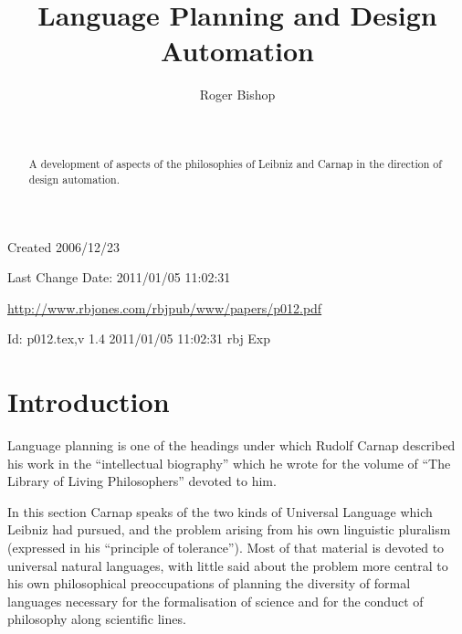 \documentclass[numreferences]{rbjk}
\begin{document}
                                                                                   
\begin{article}
\begin{opening}  
\title{Language Planning and Design Automation}
\author{Roger Bishop }
\date{$ $\ $ $}

\begin{abstract}
A development of aspects of the philosophies of Leibniz and Carnap in the direction of design automation.
\end{abstract}

\end{opening}

\vfill

\begin{centering}
\footnotesize{
Created 2006/12/23

Last Change $ $Date: 2011/01/05 11:02:31 $ $

\href{http://www.rbjones.com/rbjpub/www/papers/p012.pdf}{http://www.rbjones.com/rbjpub/www/papers/p012.pdf}

$ $Id: p012.tex,v 1.4 2011/01/05 11:02:31 rbj Exp $ $\\

}%
\end{centering}

\newpage
\setcounter{tocdepth}{4}
{\parskip-0pt\tableofcontents}

\section{Introduction}

Language planning is one of the headings under which Rudolf Carnap described his work in the ``intellectual biography''\cite{carnap63} which he wrote for the volume of ``The Library of Living Philosophers'' devoted to him\cite{carnap63a}.

In this section Carnap speaks of the two kinds of Universal Language which Leibniz had pursued, and the problem arising from his own linguistic pluralism (expressed in his ``principle of tolerance'').
Most of that material is devoted to universal natural languages, with little said about the problem more central to his own philosophical preoccupations of planning the diversity of formal languages necessary for the formalisation of science and for the conduct of philosophy along scientific lines.


\end{article}
\end{document}
